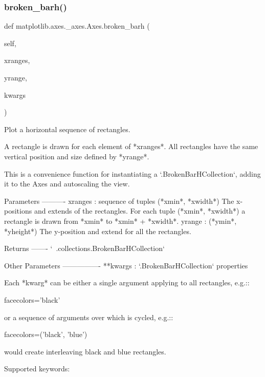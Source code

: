  \mbox{\label{classmatplotlib_1_1axes_1_1__axes_1_1Axes_a84c05785845203ad5e53298944250fbd}} 
\subsubsection{\texorpdfstring{broken\+\_\+barh()}{broken\_barh()}}
{\footnotesize\ttfamily def matplotlib.\+axes.\+\_\+axes.\+Axes.\+broken\+\_\+barh (\begin{DoxyParamCaption}\item[{}]{self,  }\item[{}]{xranges,  }\item[{}]{yrange,  }\item[{}]{kwargs }\end{DoxyParamCaption})}

\begin{DoxyVerb}Plot a horizontal sequence of rectangles.

A rectangle is drawn for each element of *xranges*. All rectangles
have the same vertical position and size defined by *yrange*.

This is a convenience function for instantiating a
`.BrokenBarHCollection`, adding it to the Axes and autoscaling the
view.

Parameters
----------
xranges : sequence of tuples (*xmin*, *xwidth*)
    The x-positions and extends of the rectangles. For each tuple
    (*xmin*, *xwidth*) a rectangle is drawn from *xmin* to *xmin* +
    *xwidth*.
yrange : (*ymin*, *yheight*)
    The y-position and extend for all the rectangles.

Returns
-------
`~.collections.BrokenBarHCollection`

Other Parameters
----------------
**kwargs : `.BrokenBarHCollection` properties

    Each *kwarg* can be either a single argument applying to all
    rectangles, e.g.::

facecolors='black'

    or a sequence of arguments over which is cycled, e.g.::

facecolors=('black', 'blue')

    would create interleaving black and blue rectangles.

    Supported keywords:

\end{DoxyVerb}
 \mbox{\label{classmatplotlib_1_1axes_1_1__axes_1_1Axes_aa7e55966db2d7da950b46bbe69cc3849}} 
